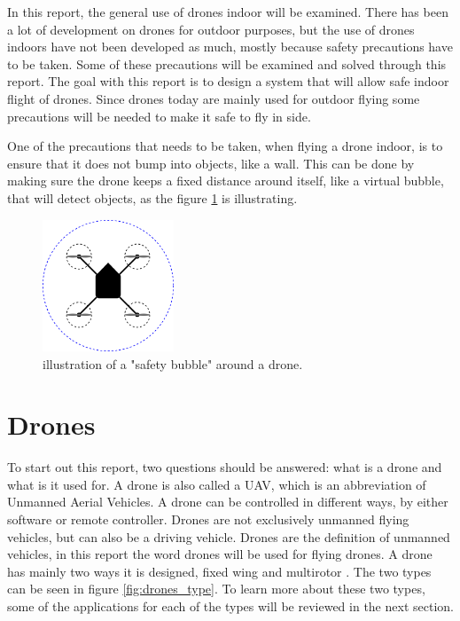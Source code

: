 In this report, the general use of drones indoor will be examined. There has been a lot of development on drones for outdoor purposes, but the use of drones indoors have not been developed as much, mostly because safety precautions have to be taken.
Some of these precautions will be examined and solved through this report. The goal with this report is to design a system that will allow safe indoor flight of drones. \newline
Since drones today are mainly used for outdoor flying some precautions will be needed to make it safe to fly in side.

One of the precautions that needs to be taken, when flying a drone indoor, is to ensure that it does not bump into objects, like a wall. This can be done by making sure the drone keeps a fixed distance around itself, like a virtual bubble, that will detect objects, as the figure \ref{fig:introSaftyBobble} is illustrating. %
\begin{figure}[H]
    \centering
    \includegraphics[width=0.35\textwidth]{figures/ch_intro/BobleOmDrone.png}
    \caption{illustration of a "safety bubble" around a drone.}
    \label{fig:introSaftyBobble}
\end{figure}





\section{Drones}\label{s:drones}
To start out this report, two questions should be answered: what is a drone and what is it used for. 
A drone is also called a UAV, which is an abbreviation of Unmanned Aerial Vehicles. A drone can be controlled in different ways, by either software or remote controller. Drones are not exclusively unmanned flying vehicles, but can also be a driving vehicle. Drones are the definition of unmanned vehicles, in this report the word drones will be used for flying drones.   
A drone has mainly two ways it is designed, fixed wing and multirotor \cite{drones_type}. The two types can be seen in figure \ref{fig:drones_type}. To learn more about these two types, some of the applications for each of the types will be reviewed in the next section.

